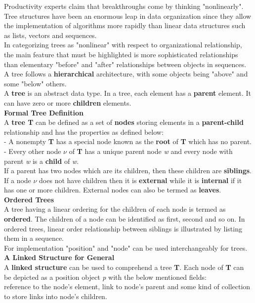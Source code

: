 		
		Productivity experts claim that breakthroughs come by thinking "nonlinearly". Tree structures have been an enormous leap in data organization since they allow the implementation of algorithms more rapidly than linear data structures such as lists, vectors and sequences.\\
		In categorizing trees as "nonlinear" with respect to organizational relationship, the main feature that must be highlighted is more sophisticated relationships than elementary "before" and "after" relationships between objects in sequences. A tree follows a \textbf{hierarchical} architecture, with some objects being "above" and some "below" others.\\
		A \textbf{tree} is an abstract data type. In a tree, each element has a \textbf{parent} element. It can have zero or more \textbf{children} elements.\\
		\textbf{Formal Tree Definition}\\
		A \textbf{tree T} can be defined as a set of \textbf{nodes} storing elements in a \textbf{parent-child} relationship and has the properties as defined below:\\
		- A nonempty \textbf{T} has a special node known as the \textbf{root} of \textbf{T} which has no parent.\\
		- Every other node \textit{$\nu$} of \textbf{T} has a unique parent node \textit{w} and every node with parent \textit{w} is a \textbf{child} of \textit{w}.\\
		If a parent has two nodes which are its children, then these children are \textbf{siblings}. If a node \textit{$\nu$} does not have children then it is \textbf{external} while it is \textbf{internal} if it has one or more children. External nodes can also be termed as \textbf{leaves}.\\
		\textbf{Ordered Trees}\\
		A tree having a linear ordering for the children of each node is termed as \textbf{ordered}. The children of a node  can be identified as first, second and so on. In ordered trees, linear order relationship between siblings is illustrated by listing them in a sequence.\\
		
		For implementation "position" and "node" can be used interchangeably for trees.\\
		
		\textbf{A Linked Structure for General}\\
		A \textbf{linked structure} can be used to comprehend a tree \textbf{T}. Each node of \textbf{T} can be depicted as a position object \textit{p} with the below mentioned fields:\\
		reference to the node's element, link to node's parent and some kind of collection to store links into node's children. 
		
